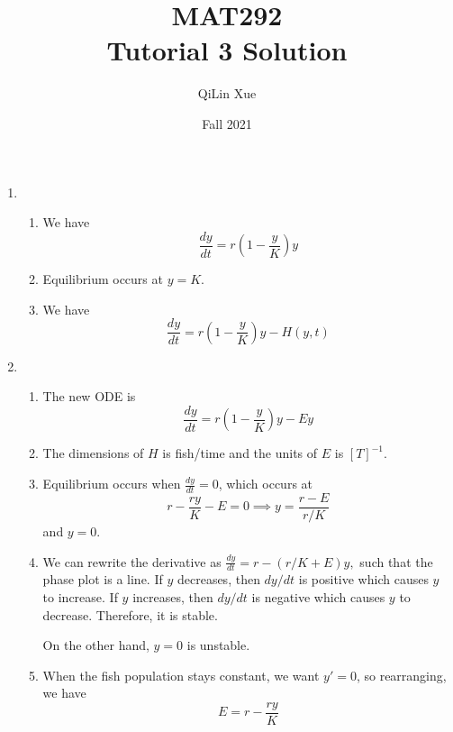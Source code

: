 \documentclass{article}
\title{MAT292 \\ Tutorial 3 Solution}
\author{QiLin Xue}
\date{Fall 2021}
\begin{document}
\newcommand{\tabitem}{~~\llap{\textbullet}~~}

\maketitle
\begin{enumerate}
    \item \begin{enumerate}
              \item We have
                    \begin{equation}
                        \frac{dy}{dt}=r\left(1-\frac{y}{K}\right)y
                    \end{equation}
              \item Equilibrium occurs at $y=K.$
              \item We have
                    \begin{equation}
                        \frac{dy}{dt} = r\left(1-\frac{y}{K}\right)y - H(y,t)
                    \end{equation}
          \end{enumerate}
    \item \begin{enumerate}
              \item The new ODE is
                    \begin{equation}
                        \frac{dy}{dt} = r\left(1-\frac{y}{K}\right)y - Ey
                    \end{equation}
              \item The dimensions of $H$ is fish/time and the units of $E$ is $[T]^{-1}.$
              \item Equilibrium occurs when $\frac{dy}{dt}=0$, which occurs at
                    \begin{equation}
                        r - \frac{ry}{K} -E = 0 \implies y = \frac{r-E}{r/K}
                    \end{equation}
                    and $y=0.$
                \item We can rewrite the derivative as $\frac{dy}{dt} = r-(r/K+E)y,$ such that the phase plot is a line. If $y$ decreases, then $dy/dt$ is positive which causes $y$ to increase. If $y$ increases, then $dy/dt$ is negative which causes $y$ to decrease. Therefore, it is stable.
                
                On the other hand, $y=0$ is unstable.
                \item When the fish population stays constant, we want $y'=0$, so rearranging, we have 
                \begin{equation}
                    E = r-\frac{ry}{K}
                \end{equation}
                

\end{enumerate}
\end{enumerate}
\end{document}
